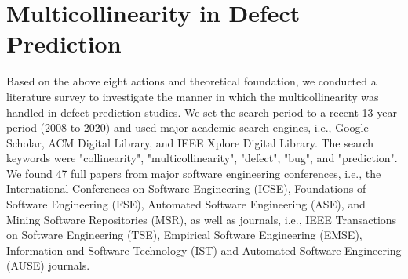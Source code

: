 \section{ Multicollinearity in Defect Prediction}
\label{sec:survey}
Based on the above eight actions and theoretical foundation, we conducted a literature survey to investigate the manner in which the multicollinearity was handled in defect prediction studies.
We set the search period to a recent 13-year period (2008 to 2020) and used major academic search engines, i.e., Google Scholar, ACM Digital Library, and IEEE Xplore Digital Library. The search keywords were "collinearity", "multicollinearity", "defect", "bug", and "prediction". We found 47 full papers from major software engineering conferences, i.e., the International Conferences on Software Engineering (ICSE), Foundations of Software Engineering (FSE), Automated Software Engineering (ASE), and Mining Software Repositories (MSR), as well as journals, i.e., IEEE Transactions on Software Engineering (TSE), Empirical Software Engineering (EMSE), Information and Software Technology (IST) and Automated Software Engineering (AUSE) journals.


